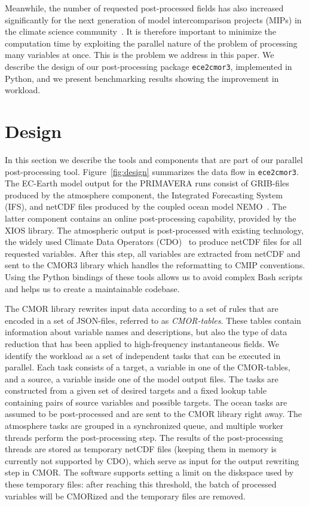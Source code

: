 \documentclass[procedia]{easychair}
\begin{document}
Meanwhile, the number of requested post-processed fields has also increased significantly for the next generation of model intercomparison projects (MIPs) in the climate 
science community~\cite{eyri:2016b}.
It is therefore important to minimize the 
computation time by 
exploiting the parallel nature of the problem of processing many variables at once.
This is the problem we address in this paper.  
We describe the design of our post-processing package \texttt{ece2cmor3}, implemented in Python, and 
we present benchmarking results showing the improvement in workload. 


\section{Design}

In this section we describe the tools and components that 
are part of our parallel post-processing tool. Figure~\ref{fig:design} summarizes the data flow in \texttt{ece2cmor3}. 
% 
The EC-Earth model output for the PRIMAVERA runs consist of GRIB-files produced 
by the atmosphere component, the Integrated Forecasting System (IFS), and 
netCDF files produced by the coupled ocean model NEMO~\cite{NEMO}. The latter 
component 
contains an online post-processing capability, provided by the XIOS library. The 
atmospheric output is post-processed with existing technology, the widely used 
Climate Data Operators (CDO)~\cite{CDO} to produce netCDF files for all 
requested 
variables. After this step, all variables are extracted from netCDF and sent to 
the CMOR3 library \cite{CMOR} which handles the reformatting to CMIP 
conventions. Using the 
Python bindings of these tools allows us to avoid complex Bash scripts and 
helps us to create a maintainable codebase.

The CMOR library rewrites input data according to a set of rules that are 
encoded in a set of JSON-files, referred to as \emph{CMOR-tables}. These tables 
contain information about variable names and descriptions, but also the type of 
data reduction that has been applied to high-frequency instantaneous fields. We 
identify the workload as a set of independent tasks that can be executed in 
parallel. Each task consists of a target, a variable in one of the CMOR-tables, 
and a source, a variable inside one of the model output files. The tasks are 
constructed from a given set of desired targets and a fixed lookup table 
containing pairs of source variables and possible targets. The ocean tasks 
are assumed to be post-processed and are sent to the CMOR library right away. 
The atmosphere tasks are grouped in a synchronized queue, and multiple worker 
threads perform the post-processing step. The results of the post-processing 
threads are stored as temporary netCDF files (keeping them in memory is 
currently not supported by CDO), which serve as input for the output rewriting 
step in CMOR. The software supports setting a limit on the diskspace used by 
these temporary files: after reaching this threshold, the batch of processed 
variables will be CMORized and the temporary files are removed.
\end{document}
